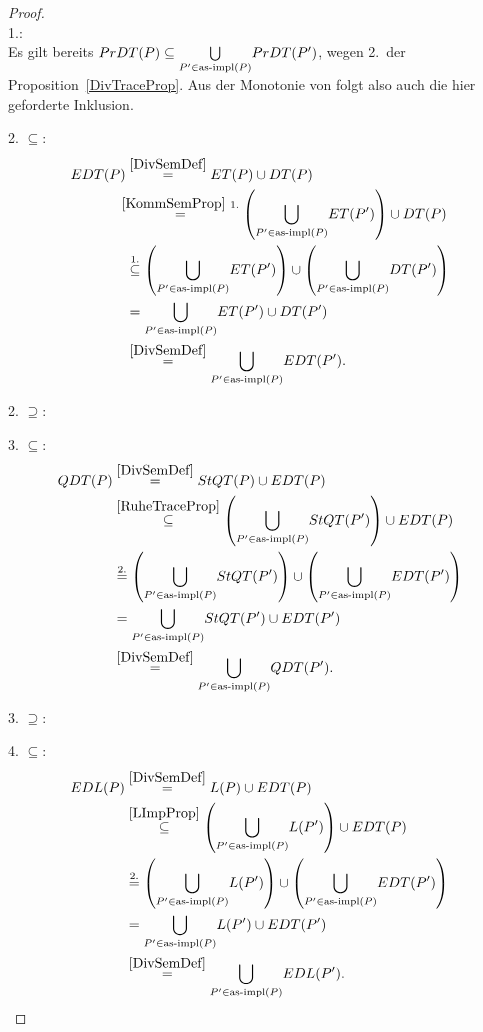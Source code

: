\begin{proof}\mbox{}\\
  1.:\\
  Es gilt bereits $PrDT (P) \subseteq \underset{P'\in\mathrm{as}\text{-}\mathrm{impl} (P)}{\bigcup}
  PrDT (P')$, wegen 2.\ der Proposition~\ref{DivTraceProp}. Aus der Monotonie
  von \cont{} folgt also auch die hier geforderte Inklusion.

  2. \glqq$\subseteq$\grqq{}:
  \begin{align*}
    \EDT (P)&\overset{\ref{DivSemDef}}{=} \ET (P)\cup \DT (P)\\
    &\hspace{-0.2cm}\overset{\ref{KommSemProp}~1.}{=} \left(\underset{P'\in
    \asimp (P)}{\bigcup} \ET (P')\right)\cup \DT (P)\\
    &\overset{1.}{\subseteq} \left(\underset{P'\in
    \asimp (P)}{\bigcup} \ET (P')\right)\cup \left(\underset{P'\in \asimp
    (P)}{\bigcup} \DT (P')\right)\\
    &= \underset{P'\in \asimp (P)}{\bigcup} \ET (P') \cup \DT (P')\\
    &\overset{\ref{DivSemDef}}{=} \underset{P'\in\asimp (P)}{\bigcup} \EDT
    (P').\\
  \end{align*}

  2. \glqq$\supseteq$\grqq{}:\\

  3. \glqq$\subseteq$\grqq{}:
  \begin{align*}
    QDT (P)&\overset{\ref{DivSemDef}}{=} StQT (P)\cup EDT (P)\\
    &\overset{\ref{RuheTraceProp}}{\subseteq} \left(\underset{P'\in \mathrm{as}\text{-}\mathrm{impl}
    (P)}{\bigcup} StQT (P')\right)\cup EDT (P)\\
    &\overset{2.}{=} \left(\underset{P'\in \mathrm{as}\text{-}\mathrm{impl} (P)}{\bigcup} StQT
    (P')\right)\cup \left(\underset{P'\in \mathrm{as}\text{-}\mathrm{impl} (P)}{\bigcup} EDT
    (P')\right)\\
    &= \underset{P'\in \mathrm{as}\text{-}\mathrm{impl} (P)}{\bigcup} StQT (P') \cup EDT (P')\\
    &\overset{\ref{DivSemDef}}{=} \underset{P'\in\mathrm{as}\text{-}\mathrm{impl} (P)}{\bigcup} QDT
    (P').\\
  \end{align*}

  3. \glqq$\supseteq$\grqq{}:\\

  4. \glqq$\subseteq$\grqq{}:
  \begin{align*}
    EDL (P)&\overset{\ref{DivSemDef}}{=} L (P)\cup EDT (P)\\
    &\overset{\ref{LImpProp}}{\subseteq} \left(\underset{P'\in \mathrm{as}\text{-}\mathrm{impl}
    (P)}{\bigcup} L (P')\right) \cup EDT (P)\\
    &\overset{2.}{=} \left(\underset{P'\in \mathrm{as}\text{-}\mathrm{impl} (P)}{\bigcup} L (P')\right)
    \cup \left(\underset{P'\in \mathrm{as}\text{-}\mathrm{impl} (P)}{\bigcup} EDT (P')\right)\\
    &= \underset{P'\in \mathrm{as}\text{-}\mathrm{impl} (P)}{\bigcup} L (P') \cup EDT (P')\\
    &\overset{\ref{DivSemDef}}{=} \underset{P'\in\mathrm{as}\text{-}\mathrm{impl} (P)}{\bigcup} EDL
    (P').\\
  \end{align*}


\end{proof}

